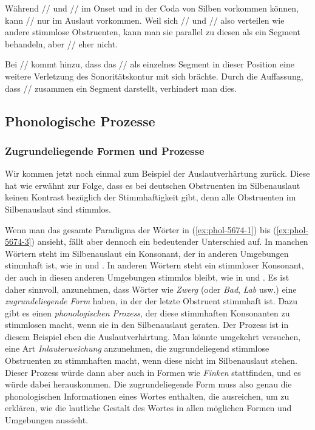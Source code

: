 \begin{exe}
  \ex\label{ex:phol81209} 
  \begin{xlist}
  \end{xlist}
\end{exe}

Während // und // im Onset und in der Coda von Silben vorkommen können, kann // nur im Auslaut vorkommen.
Weil sich // und // also verteilen wie andere stimmlose Obstruenten, kann man sie parallel zu diesen als ein Segment behandeln, aber // eher nicht.

Bei // kommt hinzu, dass das // als einzelnes Segment in dieser Position eine weitere Verletzung des Sonoritätskontur mit sich brächte.
Durch die Auffassung, dass // zusammen ein Segment darstellt, verhindert man dies.

\subsection{Phonologische Prozesse}
\label{sec:pholfeat}
\label{sec:ur}

\subsubsection{Zugrundeliegende Formen und Prozesse}

Wir kommen jetzt noch einmal zum Beispiel der Auslautverhärtung zurück.
Diese hat wie erwähnt zur Folge, dass es bei deutschen Obstruenten im Silbenauslaut keinen Kontrast bezüglich der Stimmhaftigkeit gibt, denn alle Obstruenten im Silbenauslaut sind stimmlos.

Wenn man das gesamte Paradigma der Wörter in (\ref{ex:phol-5674-1}) bis (\ref{ex:phol-5674-3}) ansieht, fällt aber dennoch ein bedeutender Unterschied auf.
In manchen Wörtern steht im Silbenauslaut ein Konsonant, der in anderen Umgebungen stimmhaft ist, wie in \textipa{[\t{ts}v\t{E@}k]} und \textipa{[\t{ts}v\t{E@}g@s]}.
In anderen Wörtern steht ein stimmloser Konsonant, der auch in diesen anderen Umgebungen stimmlos bleibt, wie in \textipa{[fINk]} und \textipa{[fINk@n]}.
Es ist daher sinnvoll, anzunehmen, dass Wörter wie \textit{Zwerg} (oder \textit{Bad}, \textit{Lab} usw.) eine \textit{zugrundeliegende Form} haben, in der der letzte Obstruent stimmhaft ist.
Dazu gibt es einen \textit{phonologischen Prozess}, der diese stimmhaften Konsonanten zu stimmlosen macht, wenn sie in den Silbenauslaut geraten.%
Der Prozess ist in diesem Beispiel eben die Auslautverhärtung.
Man könnte umgekehrt versuchen, eine Art \textit{Inlauterweichung} anzunehmen, die zugrundeliegend stimmlose Obstruenten zu stimmhaften macht, wenn diese nicht im Silbenauslaut stehen.
Dieser Prozess würde dann aber auch in Formen wie \textit{Finken} stattfinden, und es würde\Ast\textipa{[fIN@n]} dabei herauskommen.
Die zugrundeliegende Form muss also genau die phonologischen Informationen eines Wortes enthalten, die ausreichen, um zu erklären, wie die lautliche Gestalt des Wortes in allen möglichen Formen und Umgebungen aussieht.

